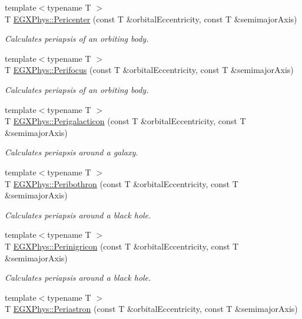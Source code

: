 \begin{DoxyCompactItemize}
{\footnotesize template$<$typename T $>$ }\\T \hyperlink{group___astrophysics_gac4c419a87a5802cf6afc98f50792e99f}{E\+G\+X\+Phys\+::\+Pericenter} (const T \&orbital\+Eccentricity, const T \&semimajor\+Axis)
\begin{DoxyCompactList}\small\item\em Calculates periapsis of an orbiting body. \end{DoxyCompactList}\item 
{\footnotesize template$<$typename T $>$ }\\T \hyperlink{group___astrophysics_gaff62669fb364a245cb85f9a91d8ea71f}{E\+G\+X\+Phys\+::\+Perifocus} (const T \&orbital\+Eccentricity, const T \&semimajor\+Axis)
\begin{DoxyCompactList}\small\item\em Calculates periapsis of an orbiting body. \end{DoxyCompactList}\item 
{\footnotesize template$<$typename T $>$ }\\T \hyperlink{group___astrophysics_ga074fecab96b90bebffa512a37e52d90b}{E\+G\+X\+Phys\+::\+Perigalacticon} (const T \&orbital\+Eccentricity, const T \&semimajor\+Axis)
\begin{DoxyCompactList}\small\item\em Calculates periapsis around a galaxy. \end{DoxyCompactList}\item 
{\footnotesize template$<$typename T $>$ }\\T \hyperlink{group___astrophysics_gada5892309279a3a687c4eb2f88238e4e}{E\+G\+X\+Phys\+::\+Peribothron} (const T \&orbital\+Eccentricity, const T \&semimajor\+Axis)
\begin{DoxyCompactList}\small\item\em Calculates periapsis around a black hole. \end{DoxyCompactList}\item 
{\footnotesize template$<$typename T $>$ }\\T \hyperlink{group___astrophysics_ga99d86af90179994e17158b082c502fd4}{E\+G\+X\+Phys\+::\+Perinigricon} (const T \&orbital\+Eccentricity, const T \&semimajor\+Axis)
\begin{DoxyCompactList}\small\item\em Calculates periapsis around a black hole. \end{DoxyCompactList}\item 
{\footnotesize template$<$typename T $>$ }\\T \hyperlink{group___astrophysics_ga477de6824cbb5986cdae923141e21648}{E\+G\+X\+Phys\+::\+Periastron} (const T \&orbital\+Eccentricity, const T \&semimajor\+Axis)

\end{DoxyCompactItemize}
